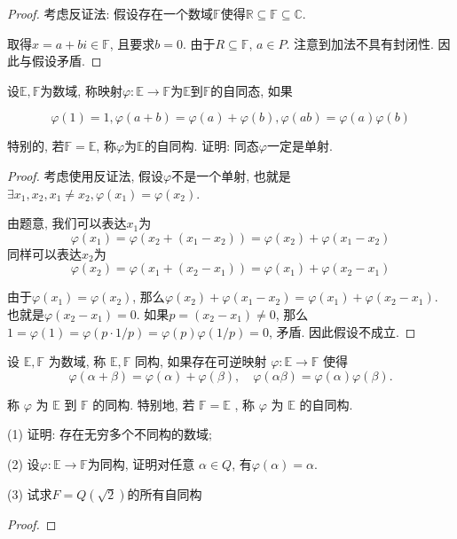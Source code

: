     \begin{proof}
        考虑反证法: 假设存在一个数域$\mathbb{F}$使得$\mathbb{R}\subseteq \mathbb{F} \subseteq \mathbb{C}$. 

        取得$x = a+bi \in \mathbb{F}$, 且要求$b=0$. 由于$R\subseteq \mathbb{F}$, $a\in P$. 注意到加法不具有封闭性. 因此与假设矛盾.   
    \end{proof}

    \begin{prob}
        设$\mathbb{E,F}$为数域, 称映射$\varphi: \mathbb{E}\rightarrow \mathbb{F}$为$\mathbb{E}$到$\mathbb{F}$的自同态, 如果

        $$\varphi(1)=1, \varphi(a+b)=\varphi(a)+\varphi(b),\varphi(ab)=\varphi(a)\varphi(b)$$

        特别的, 若$\mathbb{F}=\mathbb{E}$, 称$\varphi$为$\mathbb{E}$的自同构. 证明: 同态$\varphi$一定是单射. 
    \end{prob}

    \begin{proof}
        考虑使用反证法, 假设$\varphi$不是一个单射, 也就是$\exists x_1,x_2, x_1 \neq x_2, \varphi(x_1) = \varphi(x_2)$.

        由题意, 我们可以表达$x_1$为
        $$
        \varphi(x_1)=\varphi(x_2+(x_1-x_2))=\varphi(x_2)+\varphi(x_1-x_2)
        $$
        同样可以表达$x_2$为
        $$
        \varphi(x_2)=\varphi(x_1+(x_2-x_1))=\varphi(x_1)+\varphi(x_2-x_1)
        $$

        由于$\varphi(x_1)=\varphi(x_2)$, 那么$\varphi(x_2)+\varphi(x_1-x_2)=\varphi(x_1)+\varphi(x_2-x_1)$. 也就是$\varphi(x_2-x_1)=0$. 如果$p=(x_2-x_1)\neq 0$, 那么$1=\varphi(1)=\varphi(p\cdot 1/p)=\varphi(p)\varphi(1/p)=0$, 矛盾. 因此假设不成立. 

        
    \end{proof}

    \begin{prob}
        设  $\mathbb{E}, \mathbb{F}$  为数域, 称  $\mathbb{E}, \mathbb{F}$  同构, 如果存在可逆映射  $\varphi: \mathbb{E} \rightarrow \mathbb{F}$  使得$$\varphi(\alpha+\beta)=\varphi(\alpha)+\varphi(\beta), \quad \varphi(\alpha \beta)=\varphi(\alpha) \varphi(\beta) .$$

        称  $\varphi$  为  $\mathbb{E}$  到  $\mathbb{F}$  的同构. 特别地, 若  $\mathbb{F}=\mathbb{E}$ , 称  $\varphi$  为  $\mathbb{E}$  的自同构.
        
        (1) 证明: 存在无穷多个不同构的数域;

        (2) 设$ \varphi:\mathbb{E} \rightarrow \mathbb{F} $为同构, 证明对任意 $\alpha \in Q$, 有$\varphi(\alpha)=\alpha$. 

        (3) 试求$F=Q(\sqrt{2})$的所有自同构
    \end{prob}

    \begin{proof}
    \end{proof}
    


